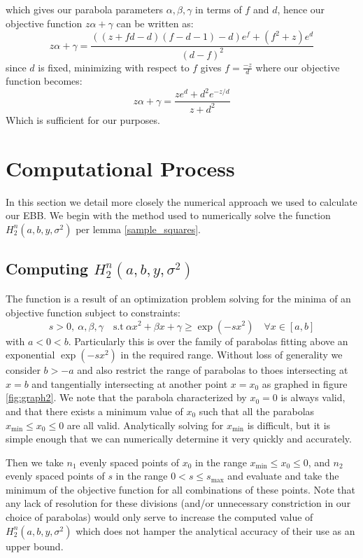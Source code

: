 \documentclass[aap,preprint]{imsart}
\begin{document}
which gives our parabola parameters $\alpha,\beta,\gamma$ in terms of $f$ and $d$, hence our objective function $z\alpha+\gamma$ can be written as:
$$z\alpha+\gamma = \frac{((z+fd-d)(f-d-1)-d)e^f+(f^2+z)e^d}{(d-f)^2}$$
since $d$ is fixed, minimizing with respect to $f$ gives $f=\frac{-z}{d}$ where our objective function becomes:
$$z\alpha+\gamma = \frac{ze^d + d^2e^{-z/d}}{z + d^2}$$
Which is sufficient for our purposes.

\section{Computational Process}\label{appendix2}
In this section we detail more closely the numerical approach we used to calculate our EBB.
We begin with the method used to numerically solve the function $ H_2^n(a,b,y,\sigma^2) $ per lemma \ref{sample_squares}.

\subsection{Computing $H_2^n(a,b,y,\sigma^2)$}
The function is a result of an optimization problem solving for the minima of an objective function subject to constraints: $$s>0,~\alpha,\beta,\gamma\quad  \text{s.t}~\alpha x^2 + \beta x + \gamma\ge\exp(-sx^2)\quad \forall x\in[a,b]$$
with $a<0<b$. Particularly this is over the family of parabolas fitting above an exponential $\exp(-sx^2)$ in the required range. Without loss of generality we consider $b>-a$ and also restrict the range of parabolas to thoes intersecting at $x=b$ and tangentially intersecting at another point $x=x_0$ as graphed in figure \ref{fig:graph2}. We note that the parabola characterized by $x_0=0$ is always valid, and that there exists a minimum value of $x_0$ such that all the parabolas $x_\text{min}\le x_0\le 0$ are all valid.
Analytically solving for $x_\text{min}$ is difficult, but it is simple enough that we can numerically determine it very quickly and accurately.

Then we take $n_1$ evenly spaced points of $x_0$ in the range $x_\text{min}\le x_0\le 0$, and $n_2$ evenly spaced points of $s$ in the range $0<s\le s_\text{max}$ and evaluate and take the minimum of the objective function for all combinations of these points. Note that any lack of resolution for these divisions (and/or unnecessary constriction in our choice of parabolas) would only serve to increase the computed value of $H_2^n(a,b,y,\sigma^2)$ which does not hamper the analytical accuracy of their use as an upper bound.
\end{document}
